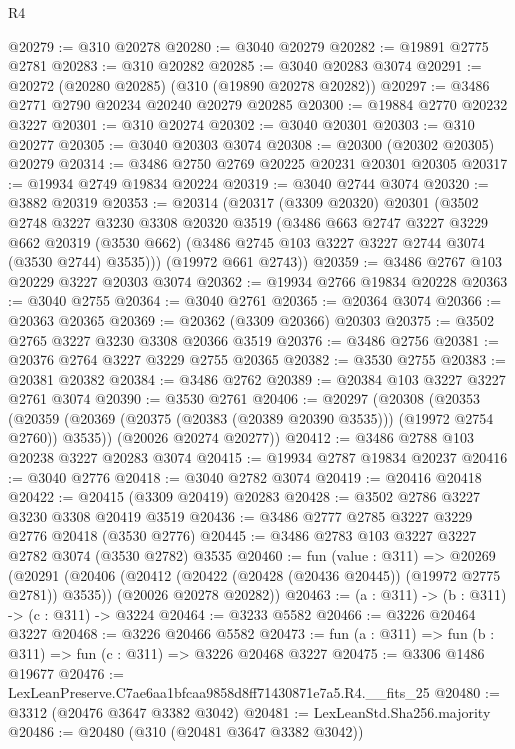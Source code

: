 \begin{lexlean}{R4}
\begin{coremodule}
@20279 := @310 @20278
@20280 := @3040 @20279
@20282 := @19891 @2775 @2781
@20283 := @310 @20282
@20285 := @3040 @20283 @3074
@20291 := @20272 (@20280 @20285) (@310 (@19890 @20278 @20282))
@20297 := @3486 @2771 @2790 @20234 @20240 @20279 @20285
@20300 := @19884 @2770 @20232 @3227
@20301 := @310 @20274
@20302 := @3040 @20301
@20303 := @310 @20277
@20305 := @3040 @20303 @3074
@20308 := @20300 (@20302 @20305) @20279
@20314 := @3486 @2750 @2769 @20225 @20231 @20301 @20305
@20317 := @19934 @2749 @19834 @20224
@20319 := @3040 @2744 @3074
@20320 := @3882 @20319
@20353 := @20314
    (@20317
      (@3309 @20320)
      @20301
      (@3502
        @2748
        @3227
        @3230
        @3308
        @20320
        @3519
        (@3486
          @663
          @2747
          @3227
          @3229
          @662
          @20319
          (@3530 @662)
          (@3486 @2745 @103 @3227 @3227 @2744 @3074 (@3530 @2744) @3535)))
      (@19972 @661 @2743))
@20359 := @3486 @2767 @103 @20229 @3227 @20303 @3074
@20362 := @19934 @2766 @19834 @20228
@20363 := @3040 @2755
@20364 := @3040 @2761
@20365 := @20364 @3074
@20366 := @20363 @20365
@20369 := @20362 (@3309 @20366) @20303
@20375 := @3502 @2765 @3227 @3230 @3308 @20366 @3519
@20376 := @3486 @2756
@20381 := @20376 @2764 @3227 @3229 @2755 @20365
@20382 := @3530 @2755
@20383 := @20381 @20382
@20384 := @3486 @2762
@20389 := @20384 @103 @3227 @3227 @2761 @3074
@20390 := @3530 @2761
@20406 := @20297
    (@20308
      (@20353 (@20359 (@20369 (@20375 (@20383 (@20389 @20390 @3535))) (@19972 @2754 @2760)) @3535))
      (@20026 @20274 @20277))
@20412 := @3486 @2788 @103 @20238 @3227 @20283 @3074
@20415 := @19934 @2787 @19834 @20237
@20416 := @3040 @2776
@20418 := @3040 @2782 @3074
@20419 := @20416 @20418
@20422 := @20415 (@3309 @20419) @20283
@20428 := @3502 @2786 @3227 @3230 @3308 @20419 @3519
@20436 := @3486 @2777 @2785 @3227 @3229 @2776 @20418 (@3530 @2776)
@20445 := @3486 @2783 @103 @3227 @3227 @2782 @3074 (@3530 @2782) @3535
@20460 := fun (value : @311) =>
  @20269
    (@20291
      (@20406 (@20412 (@20422 (@20428 (@20436 @20445)) (@19972 @2775 @2781)) @3535))
      (@20026 @20278 @20282))
@20463 := (a : @311) -> (b : @311) -> (c : @311) -> @3224
@20464 := @3233 @5582
@20466 := @3226 @20464 @3227
@20468 := @3226 @20466 @5582
@20473 := fun (a : @311) => fun (b : @311) => fun (c : @311) => @3226 @20468 @3227
@20475 := @3306 @1486 @19677
@20476 := LexLeanPreserve.C7ae6aa1bfcaa9858d8ff71430871e7a5.R4.__fits_25
@20480 := @3312 (@20476 @3647 @3382 @3042)
@20481 := LexLeanStd.Sha256.majority
@20486 := @20480 (@310 (@20481 @3647 @3382 @3042))

\end{coremodule}
\end{lexlean}
